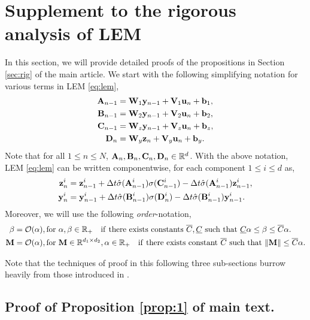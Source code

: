\documentclass{article} \usepackage{iclr2022_conference,times}
\newcommand{\by}{{\bf y}}
\newcommand{\bz}{{\bf z}}
\newcommand{\bW}{{\bf W}}
\newcommand{\bu}{{\bf u}}
\newcommand{\bb}{{\bf b}}
\newcommand{\bV}{{\bf V}}
\newcommand{\bA}{{\bf A}}
\newcommand{\bB}{{\bf B}}
\newcommand{\bC}{{\bf C}}
\newcommand{\ord}{{\mathcal O}}
\newcommand{\R}{{\mathbb R}}
\newcommand{\Dt}{{\Delta t}}
\newcommand{\bD}{{\bf D}}
\begin{document}
\section{Supplement to the rigorous analysis of LEM}
\label{sec:rigan}
In this section, we will provide detailed proofs of the propositions in Section \ref{sec:rig} of the main article. We start with the following simplifying notation for various terms in LEM \eqref{eq:lem},
\begin{align*}
    \bA_{n-1} &= \bW_1\by_{n-1} + \bV_1\bu_{n} + \bb_1, \\
    \bB_{n-1} &= \bW_2\by_{n-1} + \bV_2\bu_{n} + \bb_2, \\
    \bC_{n-1} &= \bW_z\by_{n-1} + \bV_z\bu_{n} + \bb_z, \\
    \bD_{n} &= \bW_y\bz_{n} + \bV_y\bu_{n} + \bb_y .
\end{align*}
Note that for all $1 \leq n \leq N$, $\bA_n,\bB_n, \bC_n,\bD_n \in \R^d$. 
With the above notation, LEM \eqref{eq:lem} can be written componentwise, for each component $1 \leq i \leq d$ as,
\begin{equation}
    \label{eq:lemc}
    \begin{aligned}
    \bz_{n}^i &= \bz_{n-1}^i + \Dt \hat{\sigma}(\bA_{n-1}^i) \sigma(\bC_{n-1}^i) - \Dt \hat{\sigma}(\bA_{n-1}^i) \bz_{n-1}^i, \\
    \by_{n}^i &= \by_{n-1}^i + \Dt \hat{\sigma}(\bB_{n-1}^i) \sigma(\bD_{n}^i) - \Dt \hat{\sigma}(\bB_{n-1}^i) \by_{n-1}^i .
    \end{aligned}
\end{equation}
Moreover, we will use the following \emph{order}-notation,
\begin{equation}
    \label{eq:ord}
    \begin{aligned}
     {\bf \beta} &= \ord(\alpha), {\rm for}~\alpha,\beta \in \R_+ \quad {\rm if~there~exists~constants}~ \overline{C},\underline{C}~{\rm such~that}~\underline{C} \alpha \leq \beta \leq \overline{C} \alpha. \\
   {\bf M} &= \ord(\alpha), {\rm for}~{\bf M} \in \R^{d_1 \times d_2}, \alpha \in \R_+ \quad {\rm if~there~exists~constant}~ \overline{C}~{\rm such~that}~\|{\bf M}\| \leq \overline{C} \alpha.
   \end{aligned}
\end{equation}


Note that the techniques of proof in this following three sub-sections burrow heavily from those introduced in \citet{coRNN}.
\subsection{Proof of Proposition \ref{prop:1} of main text.}
\label{app:hsbdpf}
\end{document}
